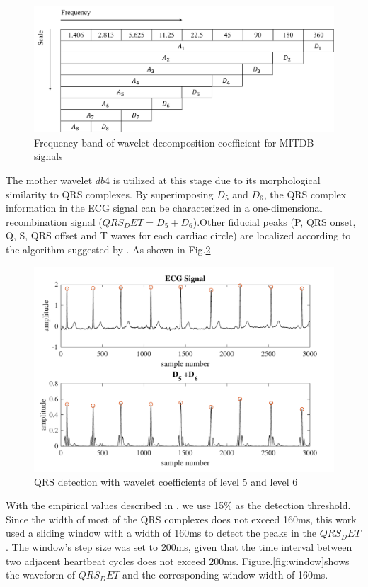\begin{figure}[t]
\centering
\includegraphics[scale=.5]{Fig/scale_wavelet.png}
\caption{Frequency band of wavelet decomposition coefficient for MITDB signals}
\label{fig:wavelet_decomp}
\end{figure}


The mother wavelet $db4$ is utilized at this stage due to its morphological similarity to QRS complexes. By superimposing $D_5$ and $D_6$, the QRS complex information in the ECG signal can be characterized in a one-dimensional recombination signal ($QRS_DET = D_5+D_6$).Other fiducial peaks (P, QRS onset, Q, S, QRS offset and T waves for each cardiac circle) are localized according to the algorithm suggested by \cite{2012qrs}. As shown in Fig.\ref{fig:QRS_d5d6}

\begin{figure}[t]
\centering
\includegraphics[scale=.7]{Fig/QRS_D5D6.pdf}
\caption{QRS detection with wavelet coefficients of level 5 and level 6}
\label{fig:QRS_d5d6}
\end{figure}


With the empirical values described in \cite{2012qrs}, we use 15\% as the detection threshold. Since the width of most of the QRS complexes does not exceed 160ms, this work used a sliding window with a width of 160ms to detect the peaks in the $QRS_DET$. The window's step size was set to 200ms, given that the time interval between two adjacent heartbeat cycles does not exceed 200ms.  Figure.\ref{fig:window}shows the waveform of $QRS_DET$ and the corresponding window width of 160ms. 

